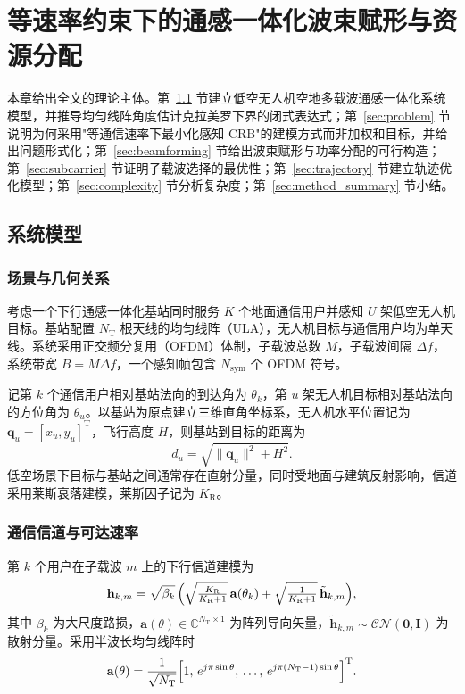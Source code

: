 \chapter{等速率约束下的通感一体化波束赋形与资源分配}
\label{chap:methodology}

本章给出全文的理论主体。第~\ref{sec:model} 节建立低空无人机空地多载波通感一体化系统模型，并推导均匀线阵角度估计克拉美罗下界的闭式表达式；第~\ref{sec:problem} 节说明为何采用"等通信速率下最小化感知 CRB"的建模方式而非加权和目标，并给出问题形式化；第~\ref{sec:beamforming} 节给出波束赋形与功率分配的可行构造；第~\ref{sec:subcarrier} 节证明子载波选择的最优性；第~\ref{sec:trajectory} 节建立轨迹优化模型；第~\ref{sec:complexity} 节分析复杂度；第~\ref{sec:method_summary} 节小结。

\section{系统模型}
\label{sec:model}

\subsection{场景与几何关系}
\label{sec:scenario}

考虑一个下行通感一体化基站同时服务 $K$ 个地面通信用户并感知 $U$ 架低空无人机目标。基站配置 $N_{\mathrm{T}}$ 根天线的均匀线阵（ULA），无人机目标与通信用户均为单天线。系统采用正交频分复用（OFDM）体制，子载波总数 $M$，子载波间隔 $\Delta f$，系统带宽 $B=M\Delta f$，一个感知帧包含 $N_{\mathrm{sym}}$ 个 OFDM 符号。

记第 $k$ 个通信用户相对基站法向的到达角为 $\theta_k$，第 $u$ 架无人机目标相对基站法向的方位角为 $\theta_u$。以基站为原点建立三维直角坐标系，无人机水平位置记为 $\mathbf{q}_u=[x_u,y_u]^{\mathrm{T}}$，飞行高度 $H$，则基站到目标的距离为
\begin{equation}
  d_u=\sqrt{\lVert\mathbf{q}_u\rVert^{2}+H^{2}}.
  \label{eq:distance}
\end{equation}
低空场景下目标与基站之间通常存在直射分量，同时受地面与建筑反射影响，信道采用莱斯衰落建模，莱斯因子记为 $K_{\mathrm{R}}$。

\subsection{通信信道与可达速率}
\label{sec:comm}

第 $k$ 个用户在子载波 $m$ 上的下行信道建模为
\begin{equation}
  \mathbf{h}_{k,m}=\sqrt{\beta_k}\,\Bigl(\sqrt{\tfrac{K_{\mathrm{R}}}{K_{\mathrm{R}}+1}}\,\mathbf{a}(\theta_k)
  +\sqrt{\tfrac{1}{K_{\mathrm{R}}+1}}\,\tilde{\mathbf{h}}_{k,m}\Bigr),
  \label{eq:channel}
\end{equation}
其中 $\beta_k$ 为大尺度路损，$\mathbf{a}(\theta)\in\mathbb{C}^{N_{\mathrm{T}}\times 1}$ 为阵列导向矢量，$\tilde{\mathbf{h}}_{k,m}\sim\mathcal{CN}(\mathbf{0},\mathbf{I})$ 为散射分量。采用半波长均匀线阵时
\begin{equation}
  \mathbf{a}(\theta)=\frac{1}{\sqrt{N_{\mathrm{T}}}}\Bigl[1,\,e^{j\pi\sin\theta},\,\ldots,\,e^{j\pi(N_{\mathrm{T}}-1)\sin\theta}\Bigr]^{\mathrm{T}}.
  \label{eq:ula}
\end{equation}

